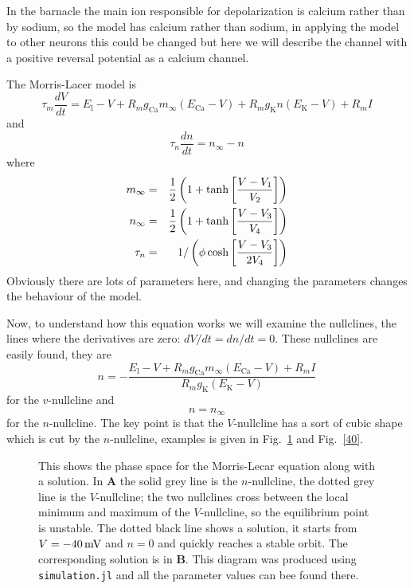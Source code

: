 \documentclass[11pt,a4paper]{scrartcl}
\newcommand{\mV}{\mbox{\,mV}}
\begin{document}
In the barnacle the main ion responsible for depolarization is calcium
rather than by sodium, so the model has calcium rather than sodium, in
applying the model to other neurons this could be changed but here we
will describe the channel with a positive reversal potential as a
calcium channel.

The Morris-Lacer model is
\begin{equation}
\tau_m\frac{dV}{dt}=E_{\text{l}}-V+R_mg_{\text{Ca}}m_\infty(E_{\text{Ca}} -V)+R_mg_{\text{K}}n(E_{\text{K}} -V)+R_mI
\end{equation}
and
\begin{equation}
\tau_n\frac{dn}{dt}=n_\infty-n
\end{equation}
where
\begin{eqnarray}
m_\infty&=&\frac{1}{2}\left(1+\tanh\left[\frac{V-V_1}{V_2}\right]\right)\cr
n_\infty&=&\frac{1}{2}\left(1+\tanh\left[\frac{V-V_3}{V_4}\right]\right)\cr
\tau_n&=&1/\left(\phi\cosh\left[\frac{V-V_3}{2V_4}\right]\right)
\end{eqnarray}
Obviously there are lots of parameters here, and changing the
parameters changes the behaviour of the model.

Now, to understand how this equation works we will examine the
nullclines, the lines where the derivatives are zero:
$dV/dt=dn/dt=0$. These nullclines are easily found, they are
\begin{equation}
n=-\frac{E_{\text{l}}-V+R_mg_{\text{Ca}}m_\infty(E_{\text{Ca}} -V)+R_mI}{R_mg_{\text{K}}(E_{\text{K}} -V)}
\end{equation}
for the $v$-nullcline and 
\begin{equation}
n=n_\infty
\end{equation}
for the $n$-nullcline. The key point is that the $V$-nullcline has a
sort of cubic shape which is cut by the
$n$-nullcline, examples is given in Fig.~\ref{60} and Fig.~\ref{40}.

\begin{figure}
\begin{center}
  
\end{center}
\caption{This shows the phase space for the Morris-Lecar equation
  along with a solution. In \textbf{A} the solid grey line is the
  $n$-nullcline, the dotted grey line is the $V$-nullcline; the two
  nullclines cross between the local minimum and maximum of the
  $V$-nullcline, so the equilibrium point is unstable. The dotted
  black line shows a solution, it starts from $V=-40\mV$ and $n=0$ and
  quickly reaches a stable orbit. The corresponding solution is in
  \textbf{B}. This diagram was produced using \texttt{simulation.jl}
  and all the parameter values can bee found there. \label{60}}
\end{figure}
\end{document}
